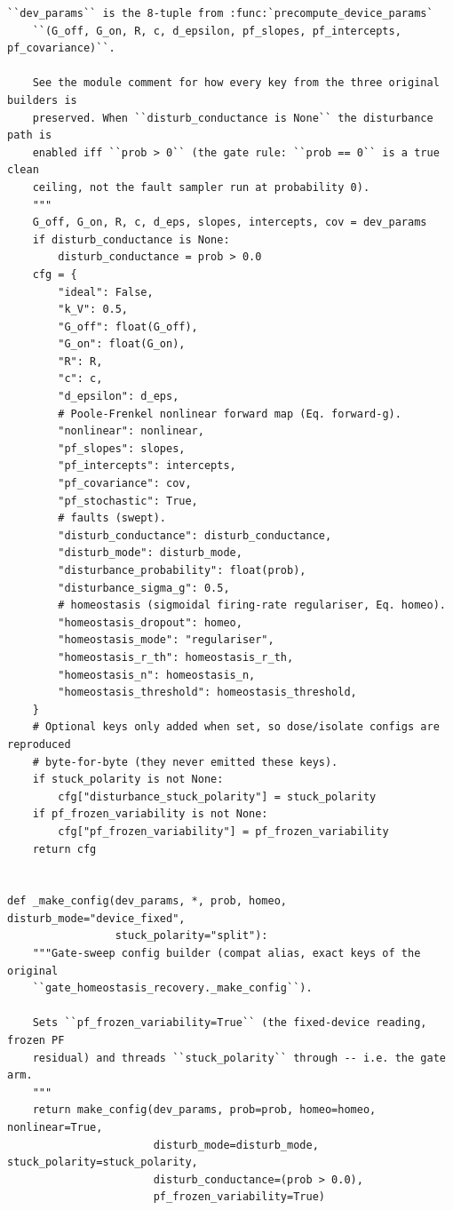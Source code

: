 \begin{lstlisting}[caption={mnn\_torch/training.py},label={lst:mnn-src-training}]
    ``dev_params`` is the 8-tuple from :func:`precompute_device_params`
    ``(G_off, G_on, R, c, d_epsilon, pf_slopes, pf_intercepts, pf_covariance)``.

    See the module comment for how every key from the three original builders is
    preserved. When ``disturb_conductance is None`` the disturbance path is
    enabled iff ``prob > 0`` (the gate rule: ``prob == 0`` is a true clean
    ceiling, not the fault sampler run at probability 0).
    """
    G_off, G_on, R, c, d_eps, slopes, intercepts, cov = dev_params
    if disturb_conductance is None:
        disturb_conductance = prob > 0.0
    cfg = {
        "ideal": False,
        "k_V": 0.5,
        "G_off": float(G_off),
        "G_on": float(G_on),
        "R": R,
        "c": c,
        "d_epsilon": d_eps,
        # Poole-Frenkel nonlinear forward map (Eq. forward-g).
        "nonlinear": nonlinear,
        "pf_slopes": slopes,
        "pf_intercepts": intercepts,
        "pf_covariance": cov,
        "pf_stochastic": True,
        # faults (swept).
        "disturb_conductance": disturb_conductance,
        "disturb_mode": disturb_mode,
        "disturbance_probability": float(prob),
        "disturbance_sigma_g": 0.5,
        # homeostasis (sigmoidal firing-rate regulariser, Eq. homeo).
        "homeostasis_dropout": homeo,
        "homeostasis_mode": "regulariser",
        "homeostasis_r_th": homeostasis_r_th,
        "homeostasis_n": homeostasis_n,
        "homeostasis_threshold": homeostasis_threshold,
    }
    # Optional keys only added when set, so dose/isolate configs are reproduced
    # byte-for-byte (they never emitted these keys).
    if stuck_polarity is not None:
        cfg["disturbance_stuck_polarity"] = stuck_polarity
    if pf_frozen_variability is not None:
        cfg["pf_frozen_variability"] = pf_frozen_variability
    return cfg


def _make_config(dev_params, *, prob, homeo, disturb_mode="device_fixed",
                 stuck_polarity="split"):
    """Gate-sweep config builder (compat alias, exact keys of the original
    ``gate_homeostasis_recovery._make_config``).

    Sets ``pf_frozen_variability=True`` (the fixed-device reading, frozen PF
    residual) and threads ``stuck_polarity`` through -- i.e. the gate arm.
    """
    return make_config(dev_params, prob=prob, homeo=homeo, nonlinear=True,
                       disturb_mode=disturb_mode, stuck_polarity=stuck_polarity,
                       disturb_conductance=(prob > 0.0),
                       pf_frozen_variability=True)



\end{lstlisting}
